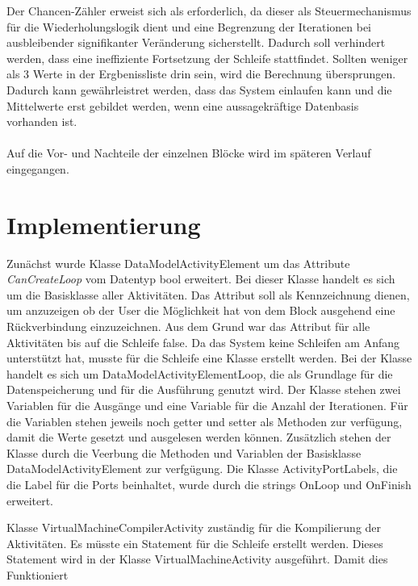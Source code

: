 \documentclass{article}
\begin{document}
    Der Chancen-Zähler erweist sich als erforderlich, da dieser als Steuermechanismus für die Wiederholungslogik dient und eine Begrenzung der Iterationen bei ausbleibender signifikanter Veränderung sicherstellt.
    Dadurch soll verhindert werden, dass eine ineffiziente Fortsetzung der Schleife stattfindet.
    Sollten weniger als 3 Werte in der Ergbenissliste drin sein, wird die Berechnung übersprungen. Dadurch kann gewährleistret werden, dass das System einlaufen kann und die Mittelwerte erst gebildet werden, wenn eine aussagekräftige Datenbasis vorhanden ist.\\
    \\
    Auf die Vor- und Nachteile der einzelnen Blöcke wird im späteren Verlauf eingegangen.

    \newpage
    \section{Implementierung}
    Zunächst wurde Klasse DataModelActivityElement um das Attribute \textit{CanCreateLoop} vom Datentyp bool erweitert. Bei dieser Klasse handelt es sich um die Basisklasse aller Aktivitäten.
    Das Attribut soll als Kennzeichnung dienen, um anzuzeigen ob der User die Möglichkeit hat von dem Block ausgehend eine Rückverbindung einzuzeichnen. Aus dem Grund war das Attribut für alle Aktivitäten bis auf die Schleife false.
    Da das System keine Schleifen am Anfang unterstützt hat, musste für die Schleife eine Klasse erstellt werden.
    Bei der Klasse handelt es sich um DataModelActivityElementLoop, die als Grundlage für die Datenspeicherung und für die Ausführung genutzt wird.
    Der Klasse stehen zwei Variablen für die Ausgänge und eine Variable für die Anzahl der Iterationen. 
    Für die Variablen stehen jeweils noch getter und setter als Methoden zur verfügung, damit die Werte gesetzt und ausgelesen werden können.
    Zusätzlich stehen der Klasse durch die Veerbung die Methoden und Variablen der Basisklasse DataModelActivityElement zur verfgügung.
    Die Klasse ActivityPortLabels, die die Label für die Ports beinhaltet, wurde durch die strings OnLoop und OnFinish erweitert.
    
    Klasse VirtualMachineCompilerActivity zuständig für die Kompilierung der Aktivitäten. Es müsste ein Statement für die Schleife erstellt werden.
    Dieses Statement wird in der Klasse VirtualMachineActivity ausgeführt.
    Damit dies Funktioniert
    
\end{document}
